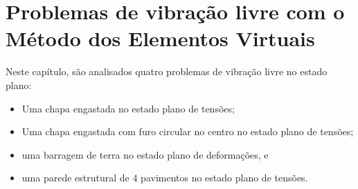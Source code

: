 \chapter{Problemas de vibração livre com o Método dos Elementos Virtuais}

\indent Neste capítulo, são analisados quatro problemas de vibração livre no estado plano:

    \begin{itemize}
        \item Uma chapa engastada no estado plano de tensões;
        \item Uma chapa engastada com furo circular no centro no estado plano de tensões;
        \item uma barragem de terra no estado plano de deformações, e
        \item uma parede estrutural de 4 pavimentos no estado plano de tensões. 
    \end{itemize}

